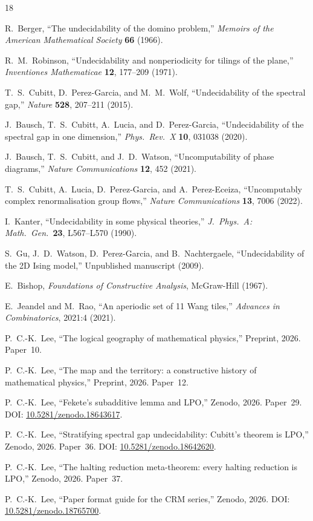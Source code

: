 \documentclass[11pt,a4paper]{article}
\theoremstyle{plain}
\theoremstyle{definition}
\begin{document}
\begin{thebibliography}{18}

R.~Berger,
``The undecidability of the domino problem,''
\emph{Memoirs of the American Mathematical Society} \textbf{66} (1966).

R.~M.~Robinson,
``Undecidability and nonperiodicity for tilings of the plane,''
\emph{Inventiones Mathematicae} \textbf{12}, 177--209 (1971).

T.~S.~Cubitt, D.~Perez-Garcia, and M.~M.~Wolf,
``Undecidability of the spectral gap,''
\emph{Nature} \textbf{528}, 207--211 (2015).

J.~Bausch, T.~S.~Cubitt, A.~Lucia, and D.~Perez-Garcia,
``Undecidability of the spectral gap in one dimension,''
\emph{Phys.\ Rev.\ X} \textbf{10}, 031038 (2020).

J.~Bausch, T.~S.~Cubitt, and J.~D.~Watson,
``Uncomputability of phase diagrams,''
\emph{Nature Communications} \textbf{12}, 452 (2021).

T.~S.~Cubitt, A.~Lucia, D.~Perez-Garcia, and A.~Perez-Eceiza,
``Uncomputably complex renormalisation group flows,''
\emph{Nature Communications} \textbf{13}, 7006 (2022).

I.~Kanter,
``Undecidability in some physical theories,''
\emph{J.\ Phys.\ A: Math.\ Gen.}\ \textbf{23}, L567--L570 (1990).

S.~Gu, J.~D.~Watson, D.~Perez-Garcia, and B.~Nachtergaele,
``Undecidability of the 2D Ising model,''
Unpublished manuscript (2009).

E.~Bishop,
\emph{Foundations of Constructive Analysis},
McGraw-Hill (1967).

E.~Jeandel and M.~Rao,
``An aperiodic set of 11 Wang tiles,''
\emph{Advances in Combinatorics}, 2021:4 (2021).

P.~C.-K.~Lee,
``The logical geography of mathematical physics,''
Preprint, 2026. Paper~10.

P.~C.-K.~Lee,
``The map and the territory: a constructive history of
  mathematical physics,''
Preprint, 2026. Paper~12.

P.~C.-K.~Lee,
``Fekete's subadditive lemma and LPO,''
Zenodo, 2026. Paper~29.
DOI: \href{https://doi.org/10.5281/zenodo.18643617}{10.5281/zenodo.18643617}.

P.~C.-K.~Lee,
``Stratifying spectral gap undecidability: Cubitt's theorem is LPO,''
Zenodo, 2026. Paper~36.
DOI: \href{https://doi.org/10.5281/zenodo.18642620}{10.5281/zenodo.18642620}.

P.~C.-K.~Lee,
``The halting reduction meta-theorem: every halting reduction is LPO,''
Zenodo, 2026. Paper~37.

P.~C.-K.~Lee,
``Paper format guide for the CRM series,''
Zenodo, 2026.
DOI: \href{https://doi.org/10.5281/zenodo.18765700}{10.5281/zenodo.18765700}.

\end{thebibliography}
\end{document}
